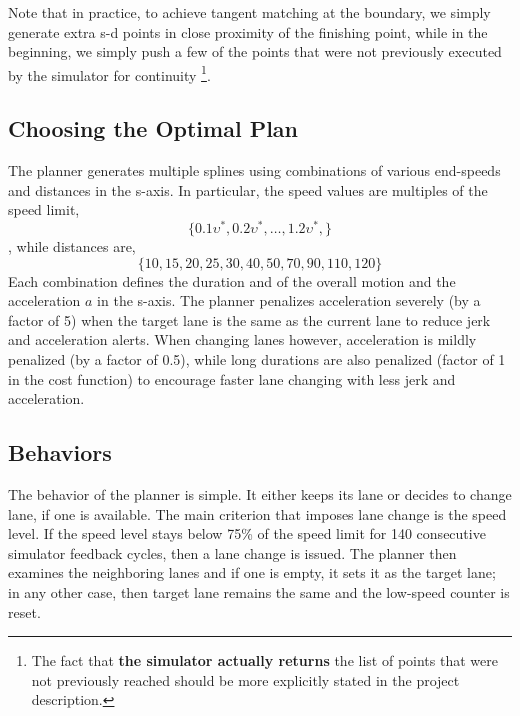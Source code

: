 \documentclass[12 pt]{article}
\begin{document}
	Note that in practice, to achieve tangent matching at the boundary, we simply generate extra s-d points in close proximity of the finishing point, while in the beginning, we simply push a few of the points that were not previously executed by the simulator for continuity \footnote{The fact that {\bf the simulator actually returns } the list of points that were not previously reached should be more explicitly stated in the project description.}.  
	\subsection{Choosing the Optimal Plan}
	
	The planner generates multiple splines using combinations of various end-speeds and distances in the s-axis. In particular, the speed values are multiples of the speed limit, 
	\begin{equation*}
	\lbrace 0.1\upsilon^{*},0.2\upsilon^{*},\ldots,1.2\upsilon^{*}, \rbrace
	\end{equation*}
	, while distances are, 
	\begin{equation*}
	\lbrace 10, 15, 20, 25, 30, 40, 50,70,90,110, 120\rbrace
	\end{equation*}
	Each combination defines the duration and of the overall motion and the acceleration $a$ in the s-axis. The planner penalizes acceleration severely (by a factor of 5) when the target lane is the same as the current lane to reduce jerk and acceleration alerts. When changing lanes however, acceleration is mildly penalized (by a factor of 0.5), while long durations are also penalized (factor of 1 in the cost function) to encourage faster lane changing with less jerk and acceleration.
	\subsection{Behaviors}
	The behavior of the planner is simple. It either keeps its lane or decides to change lane, if one is available. The main criterion that imposes lane change is the speed level. If the speed level stays below 75\% of the speed limit for 140 consecutive simulator feedback cycles, then a lane change is issued. The planner then examines the neighboring lanes and if one is empty, it sets it as the target lane; in any other case, then target lane remains the same and the low-speed counter is reset.     
%
\end{document}
